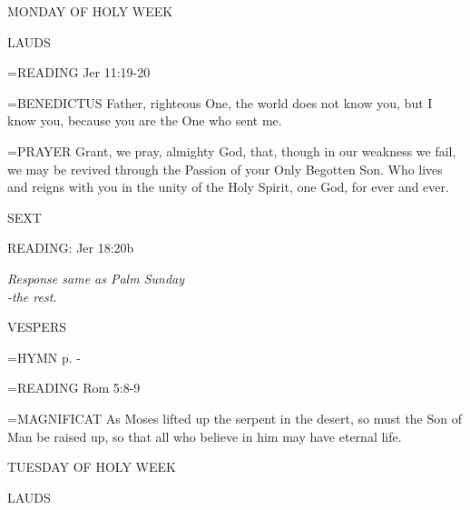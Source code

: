 \begin{center}\normalsize MONDAY OF HOLY WEEK\\
\end{center}

\begin{flushleft}\normalsize LAUDS\\\end{flushleft}

\hangindent=\parindent \small{\uppercase{READING}}    Jer 11:19-20 \textbf{   \\}

\hangindent=\parindent \small{BENEDICTUS 	Father, righteous One, the world does not know you, but I know you, because you are the One who sent me.\\}

\hangindent=\parindent \small{PRAYER 	Grant, we pray, almighty God, that, though in our weakness we fail, we may be revived through the Passion of your Only Begotten Son. Who lives and reigns with you in the unity of the Holy Spirit, one God, for ever and ever.}

\begin{flushleft}\normalsize SEXT\\\end{flushleft}

READING:    Jer 18:20b

\begin{center}
\textit{Response same as Palm Sunday\\
-the rest.}
\end{center}

\begin{flushleft}\normalsize VESPERS\\\end{flushleft}

\hangindent=\parindent \small{\uppercase{HYMN} p. \pageref{lent:firstHymn}-\pageref{lent:lastHymn}\\}

\hangindent=\parindent \small{\uppercase{READING}}    Rom 5:8-9 \textbf{   \\}

\hangindent=\parindent \small{MAGNIFICAT 	As Moses lifted up the serpent in the desert, so must the Son of Man be raised up, so that all who believe in him may have eternal life.\\}

TUESDAY OF HOLY WEEK

\begin{flushleft}\normalsize LAUDS\\\end{flushleft}

